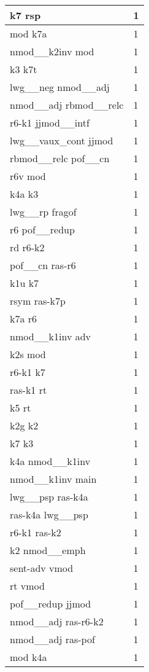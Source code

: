 \documentclass[a4 paper]{article}
\begin{document}
\begin{longtable}{p{}p{}}
k7 rsp  & 1 \\ \midrule
mod k7a  & 1 \\ \midrule
nmod\_\_k2inv mod  & 1 \\ \midrule
k3 k7t  & 1 \\ \midrule
lwg\_\_neg nmod\_\_adj  & 1 \\ \midrule
nmod\_\_adj rbmod\_\_relc  & 1 \\ \midrule
r6-k1 jjmod\_\_intf  & 1 \\ \midrule
lwg\_\_vaux\_cont jjmod  & 1 \\ \midrule
rbmod\_\_relc pof\_\_cn  & 1 \\ \midrule
r6v mod  & 1 \\ \midrule
k4a k3  & 1 \\ \midrule
lwg\_\_rp fragof  & 1 \\ \midrule
r6 pof\_\_redup  & 1 \\ \midrule
rd r6-k2  & 1 \\ \midrule
pof\_\_cn ras-r6  & 1 \\ \midrule
k1u k7  & 1 \\ \midrule
rsym ras-k7p  & 1 \\ \midrule
k7a r6  & 1 \\ \midrule
nmod\_\_k1inv adv  & 1 \\ \midrule
k2s mod  & 1 \\ \midrule
r6-k1 k7  & 1 \\ \midrule
ras-k1 rt  & 1 \\ \midrule
k5 rt  & 1 \\ \midrule
k2g k2  & 1 \\ \midrule
k7 k3  & 1 \\ \midrule
k4a nmod\_\_k1inv  & 1 \\ \midrule
nmod\_\_k1inv main  & 1 \\ \midrule
lwg\_\_psp ras-k4a  & 1 \\ \midrule
ras-k4a lwg\_\_psp  & 1 \\ \midrule
r6-k1 ras-k2  & 1 \\ \midrule
k2 nmod\_\_emph  & 1 \\ \midrule
sent-adv vmod  & 1 \\ \midrule
rt vmod  & 1 \\ \midrule
pof\_\_redup jjmod  & 1 \\ \midrule
nmod\_\_adj ras-r6-k2  & 1 \\ \midrule
nmod\_\_adj ras-pof  & 1 \\ \midrule
mod k4a  & 1 \\ \midrule

\end{longtable}
\end{document}

